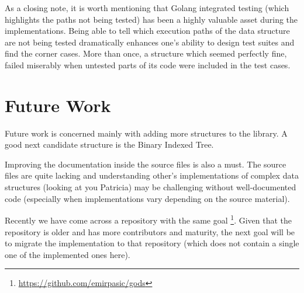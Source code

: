 \documentclass[a4paper,10pt,table,xcdraw]{article}
\begin{document}
As a closing note, it is worth mentioning that Golang integrated testing (which highlights the paths not being tested) has been a highly valuable asset during the implementations. Being able to tell which execution paths of the data structure are not being tested dramatically enhances one's ability to design test suites and find the corner cases. More than once, a structure which seemed perfectly fine, failed miserably when untested parts of its code were included in the test cases.



\section{Future Work}
\label{sec:future}

Future work is concerned mainly with adding more structures to the library. A good next candidate structure is the Binary Indexed Tree.

Improving the documentation inside the source files is also a must. The source files are quite lacking and understanding other's implementations of complex data structures (looking at you Patricia) may be challenging without well-documented code (especially when implementations vary depending on the source material).

Recently we have come across a repository with the same goal \footnote{ \url{https://github.com/emirpasic/gods}}. Given that the repository is older and has more contributors and maturity, the next goal will be to migrate the implementation to that repository (which does not contain a single one of the implemented ones here).







 

\end{document}
